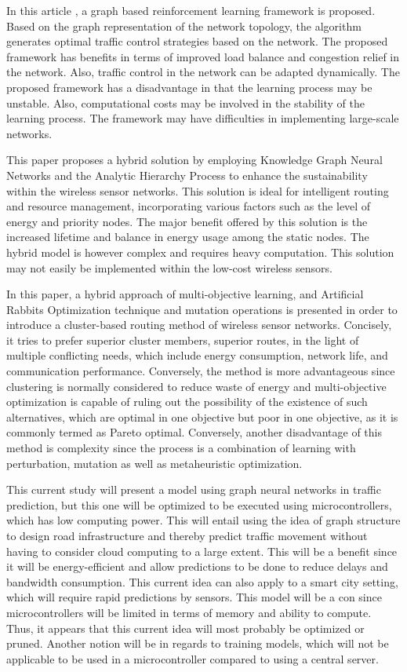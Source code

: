 \documentclass[a4paper,fleqn]{cas-dc}
\numberwithin{equation}{section}
\begin{document}
In this article \cite{Lu2025}, a graph based reinforcement learning framework is proposed. Based on the graph representation of the network topology, the algorithm generates optimal traffic control strategies based on the network. The proposed framework has benefits in terms of improved load balance and congestion relief in the network. Also, traffic control in the network can be adapted dynamically. The proposed framework has a disadvantage in that the learning process may be unstable. Also, computational costs may be involved in the stability of the learning process. The framework may have difficulties in implementing large-scale networks.

This paper \cite{BlessinaPreethi20253320} proposes a hybrid solution by employing Knowledge Graph Neural Networks and the Analytic Hierarchy Process to enhance the sustainability within the wireless sensor networks. This solution is ideal for intelligent routing and resource management, incorporating various factors such as the level of energy and priority nodes. The major benefit offered by this solution is the increased lifetime and balance in energy usage among the static nodes. The hybrid model is however complex and requires heavy computation. This solution may not easily be implemented within the low-cost wireless sensors.

In this paper,\cite{Arulanandam2025} a hybrid approach of multi-objective learning, and Artificial Rabbits Optimization technique and mutation operations is presented in order to introduce a cluster-based routing method of wireless sensor networks. Concisely, it tries to prefer superior cluster members, superior routes, in the light of multiple conflicting needs, which include energy consumption, network life, and communication performance. Conversely, the method is more advantageous since clustering is normally considered to reduce waste of energy and multi-objective optimization is capable of ruling out the possibility of the existence of such alternatives, which are optimal in one objective but poor in one objective, as it is commonly termed as Pareto optimal. Conversely, another disadvantage of this method is complexity since the process is a combination of learning with perturbation, mutation as well as metaheuristic optimization.

This current study \cite{Zoican2024} will present a model using graph neural networks in traffic prediction, but this one will be optimized to be executed using microcontrollers, which has low computing power. This will entail using the idea of graph structure to design road infrastructure and thereby predict traffic movement without having to consider cloud computing to a large extent. This will be a benefit since it will be energy-efficient and allow predictions to be done to reduce delays and bandwidth consumption. This current idea can also apply to a smart city setting, which will require rapid predictions by sensors. This model will be a con since microcontrollers will be limited in terms of memory and ability to compute. Thus, it appears that this current idea will most probably be optimized or pruned. Another notion will be in regards to training models, which will not be applicable to be used in a microcontroller compared to using a central server.
\end{document}
